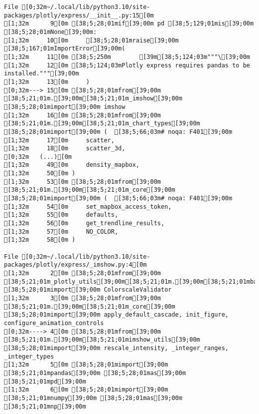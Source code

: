 \documentclass[
  letterpaper,
]{book}
\begin{document}
\begin{verbatim}
File [0;32m~/.local/lib/python3.10/site-packages/plotly/express/__init__.py:15[0m
[1;32m      9[0m [38;5;28;01mif[39;00m pd [38;5;129;01mis[39;00m [38;5;28;01mNone[39;00m:
[1;32m     10[0m     [38;5;28;01mraise[39;00m [38;5;167;01mImportError[39;00m(
[1;32m     11[0m [38;5;250m        [39m[38;5;124;03m"""\[39;00m
[1;32m     12[0m [38;5;124;03mPlotly express requires pandas to be installed."""[39;00m
[1;32m     13[0m     )
[0;32m---> 15[0m [38;5;28;01mfrom[39;00m [38;5;21;01m.[39;00m[38;5;21;01m_imshow[39;00m [38;5;28;01mimport[39;00m imshow
[1;32m     16[0m [38;5;28;01mfrom[39;00m [38;5;21;01m.[39;00m[38;5;21;01m_chart_types[39;00m [38;5;28;01mimport[39;00m (  [38;5;66;03m# noqa: F401[39;00m
[1;32m     17[0m     scatter,
[1;32m     18[0m     scatter_3d,
[0;32m   (...)[0m
[1;32m     49[0m     density_mapbox,
[1;32m     50[0m )
[1;32m     53[0m [38;5;28;01mfrom[39;00m [38;5;21;01m.[39;00m[38;5;21;01m_core[39;00m [38;5;28;01mimport[39;00m (  [38;5;66;03m# noqa: F401[39;00m
[1;32m     54[0m     set_mapbox_access_token,
[1;32m     55[0m     defaults,
[1;32m     56[0m     get_trendline_results,
[1;32m     57[0m     NO_COLOR,
[1;32m     58[0m )

File [0;32m~/.local/lib/python3.10/site-packages/plotly/express/_imshow.py:4[0m
[1;32m      2[0m [38;5;28;01mfrom[39;00m [38;5;21;01m_plotly_utils[39;00m[38;5;21;01m.[39;00m[38;5;21;01mbasevalidators[39;00m [38;5;28;01mimport[39;00m ColorscaleValidator
[1;32m      3[0m [38;5;28;01mfrom[39;00m [38;5;21;01m.[39;00m[38;5;21;01m_core[39;00m [38;5;28;01mimport[39;00m apply_default_cascade, init_figure, configure_animation_controls
[0;32m----> 4[0m [38;5;28;01mfrom[39;00m [38;5;21;01m.[39;00m[38;5;21;01mimshow_utils[39;00m [38;5;28;01mimport[39;00m rescale_intensity, _integer_ranges, _integer_types
[1;32m      5[0m [38;5;28;01mimport[39;00m [38;5;21;01mpandas[39;00m [38;5;28;01mas[39;00m [38;5;21;01mpd[39;00m
[1;32m      6[0m [38;5;28;01mimport[39;00m [38;5;21;01mnumpy[39;00m [38;5;28;01mas[39;00m [38;5;21;01mnp[39;00m


\end{verbatim}
\end{document}

